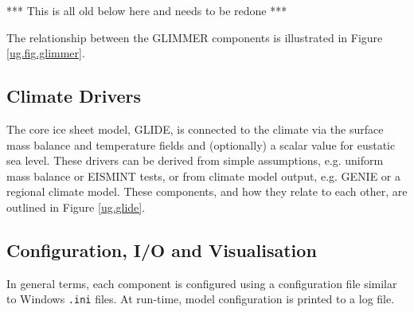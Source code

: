 \begin{itemize}
\end{itemize}
%
*** This is all old below here and needs to be redone ***

The relationship between the GLIMMER components is illustrated in Figure \ref{ug.fig.glimmer}. 
%
\subsection{Climate Drivers}
\label{subsec:climdrive}
The core ice sheet model, GLIDE, is connected to the climate via the surface mass balance and temperature fields and (optionally) a scalar value for eustatic sea level. These drivers can be derived from simple assumptions, e.g. uniform mass balance or EISMINT tests, or from climate model output, e.g. GENIE or a regional climate model. These components, and how they relate to each other, are outlined in Figure \ref{ug.glide}.
%
%
\subsection{Configuration, I/O and Visualisation}
In general terms, each component is configured using a configuration file similar to Windows \texttt{.ini} files. At run-time, model configuration is printed to a log file. 

